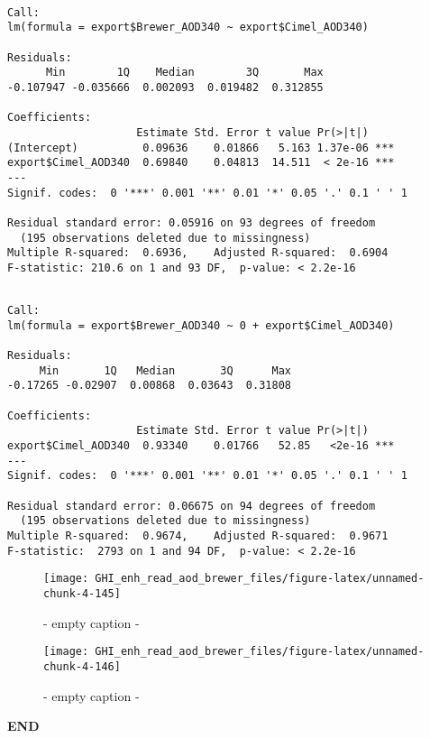 \documentclass[
  10pt,
  a4paper,oneside]{article}
\begin{document}
\begin{verbatim}

Call:
lm(formula = export$Brewer_AOD340 ~ export$Cimel_AOD340)

Residuals:
      Min        1Q    Median        3Q       Max 
-0.107947 -0.035666  0.002093  0.019482  0.312855 

Coefficients:
                    Estimate Std. Error t value Pr(>|t|)    
(Intercept)          0.09636    0.01866   5.163 1.37e-06 ***
export$Cimel_AOD340  0.69840    0.04813  14.511  < 2e-16 ***
---
Signif. codes:  0 '***' 0.001 '**' 0.01 '*' 0.05 '.' 0.1 ' ' 1

Residual standard error: 0.05916 on 93 degrees of freedom
  (195 observations deleted due to missingness)
Multiple R-squared:  0.6936,    Adjusted R-squared:  0.6904 
F-statistic: 210.6 on 1 and 93 DF,  p-value: < 2.2e-16
\end{verbatim}

\begin{verbatim}

Call:
lm(formula = export$Brewer_AOD340 ~ 0 + export$Cimel_AOD340)

Residuals:
     Min       1Q   Median       3Q      Max 
-0.17265 -0.02907  0.00868  0.03643  0.31808 

Coefficients:
                    Estimate Std. Error t value Pr(>|t|)    
export$Cimel_AOD340  0.93340    0.01766   52.85   <2e-16 ***
---
Signif. codes:  0 '***' 0.001 '**' 0.01 '*' 0.05 '.' 0.1 ' ' 1

Residual standard error: 0.06675 on 94 degrees of freedom
  (195 observations deleted due to missingness)
Multiple R-squared:  0.9674,    Adjusted R-squared:  0.9671 
F-statistic:  2793 on 1 and 94 DF,  p-value: < 2.2e-16
\end{verbatim}

\begin{figure}[H]

{\centering \texttt{[image: GHI\_enh\_read\_aod\_brewer\_files/figure-latex/unnamed-chunk-4-145]} 

}

\caption{ - empty caption - }\label{fig:unnamed-chunk-4-145}
\end{figure}
\begin{figure}[H]

{\centering \texttt{[image: GHI\_enh\_read\_aod\_brewer\_files/figure-latex/unnamed-chunk-4-146]} 

}

\caption{ - empty caption - }\label{fig:unnamed-chunk-4-146}
\end{figure}

\textbf{END}
\end{document}
